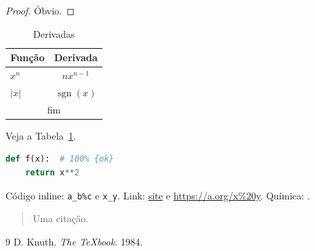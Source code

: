 \documentclass[12pt]{article}
\begin{document}
\begin{proof}
Óbvio.
\end{proof}

\begin{table}[h]
\centering
\caption{Derivadas}\label{tab:der}
\begin{tabular}{|l|c|}
\hline
Função & Derivada \\ \hline
$x^n$ & $n x^{n-1}$ \\
$|x|$ & $\operatorname{sgn}(x)$ \\
\multicolumn{2}{c}{fim} \\
\hline
\end{tabular}
\end{table}

Veja a Tabela~\ref{tab:der}.

\begin{lstlisting}[language=Python]
def f(x):  # 100% {ok}
    return x**2
\end{lstlisting}

Código inline: \verb|a_b%c| e \texttt{x\_y}. Link: \href{https://example.com}{site} e \url{https://a.org/x%20y}.
Química: .

\begin{quote}
Uma citação.
\end{quote}

\begin{thebibliography}{9}
 D. Knuth. \emph{The \TeX book}. 1984.
\end{thebibliography}
\end{document}
